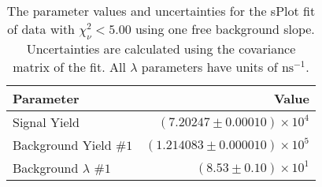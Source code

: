 
\begin{table}[ht]
    \begin{center}
        \begin{tabular}{lr}\toprule
            Parameter & Value \\\midrule
            Signal Yield & $(7.20247 \pm 0.00010) \times 10^{4}$ \\
            Background Yield $\#1$ & $(1.214083 \pm 0.000010) \times 10^{5}$ \\
            Background $\lambda$ $\#1$ & $(8.53 \pm 0.10) \times 10^{1}$ \\\bottomrule
        \end{tabular}
        \caption{The parameter values and uncertainties for the sPlot fit of data with $\chi^2_\nu < 5.00$ using one free background slope. Uncertainties are calculated using the covariance matrix of the fit. All $\lambda$ parameters have units of $\si{\nano\second}^{-1}$.}\label{tab:splot-fit-results-chisqdof-5.00-free-1}
    \end{center}
\end{table}

